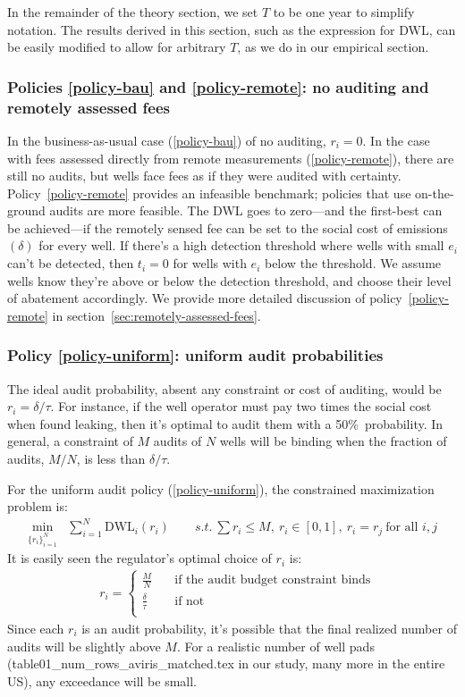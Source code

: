 In the remainder of the theory section, we set \(T\) to be one year to simplify notation.
The results derived in this section, such as the expression for \gls{DWL}, can be easily modified to allow for arbitrary \(T\), as we do in our empirical section.

\subsubsection{Policies \ref{policy-bau} and \ref{policy-remote}: no auditing and remotely assessed fees}
In the business-as-usual case (\ref{policy-bau}) of no auditing, \(r_i = 0\).
In the case with fees assessed directly from remote measurements (\ref{policy-remote}), there are still no audits, but wells face fees as if they were audited with certainty.
Policy~\ref{policy-remote} provides an infeasible benchmark; policies that use on-the-ground audits are more feasible.
The \gls{DWL} goes to zero---and the first-best can be achieved---if the remotely sensed fee can be set to the social cost of emissions \((\delta)\) for every well.
If there's a high detection threshold where wells with small \(e_i\) can't be detected, then \(t_i = 0\) for wells with \(e_i\) below the threshold.
We assume wells know they're above or below the detection threshold, and choose their level of abatement accordingly.
We provide more detailed discussion of policy~\ref{policy-remote} in section~\ref{sec:remotely-assessed-fees}.

\subsubsection{Policy \ref{policy-uniform}: uniform audit probabilities}
The ideal audit probability, absent any constraint or cost of auditing, would be \(r_i = \delta / \tau\).
For instance, if the well operator must pay two times the social cost when found leaking, then it's optimal to audit them with a 50\%~probability.
In general, a constraint  of \(M\) audits of \(N\) wells will be binding when the fraction of audits, \(M / N\), is less than \(\delta / \tau\).

For the uniform audit policy (\ref{policy-uniform}), the constrained maximization problem is:
\begin{align*}
\min_{\{r_i\}^{N}_{i=1}} &  \sum^{N}_{i=1} \text{DWL}_i(r_i) \qquad
\textit{s.t.}\ \sum r_i \leq M,\ r_i \in [0,1],\ r_i = r_j \ \text{for all } i,j
\end{align*}
It is easily seen the regulator's optimal choice of \(r_i\) is:
\begin{align*}
& r_i = \begin{cases}
  \frac{M}{N} & \quad \text{if the audit budget constraint binds} \\[5pt]
  \frac{\delta}{\tau}  & \quad \text{if not}\\[5pt]
\end{cases}
\end{align*}
Since each \(r_i\) is an audit probability, it's possible that the final realized number of audits will be slightly above \(M\).
For a realistic number of well pads
({table01_num_rows_aviris_matched.tex} in our study, many more in the entire US), any exceedance will be small.

